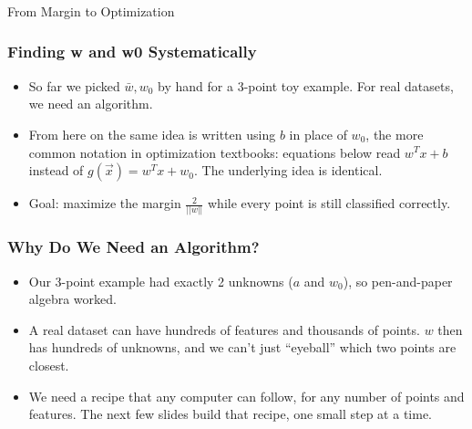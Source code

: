 \begin{frame}[fragile]\frametitle{}
\begin{center}
{\Large From Margin to Optimization}
\end{center}
\end{frame}

\begin{frame}[fragile]\frametitle{Finding w and w0 Systematically}
\begin{itemize}
\item So far we picked $\bar{w}, w_0$ by hand for a 3-point toy example. For real datasets, we need an algorithm.
\item From here on the same idea is written using $b$ in place of $w_0$, the more common notation in optimization textbooks: equations below read $w^Tx+b$ instead of $g(\vec{x})=w^Tx+w_0$. The underlying idea is identical.
\item Goal: maximize the margin $\frac{2}{||w||}$ while every point is still classified correctly.
\end{itemize}
\end{frame}

\begin{frame}[fragile]\frametitle{Why Do We Need an Algorithm?}
\begin{itemize}
\item Our 3-point example had exactly 2 unknowns ($a$ and $w_0$), so pen-and-paper algebra worked.
\item A real dataset can have hundreds of features and thousands of points. $w$ then has hundreds of unknowns, and we can't just ``eyeball'' which two points are closest.
\item We need a recipe that any computer can follow, for any number of points and features. The next few slides build that recipe, one small step at a time.
\end{itemize}
\end{frame}


